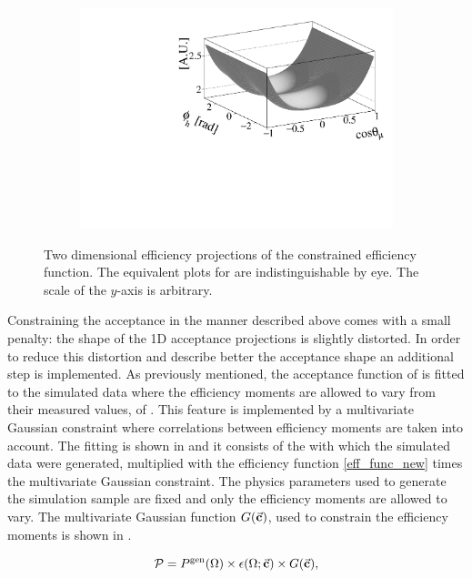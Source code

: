 \begin{figure}[t]
\begin{subfigure}{0.5\textwidth}
    \includegraphics[width=\textwidth]{Figures/Chapter4/canv_cosThL_phi_Sim08_3fb_hel_negKaons_all.pdf}
    \caption{}
    \label{eff2D_lp}
  \end{subfigure}
\caption{Two dimensional efficiency projections of the constrained efficiency function.
         The equivalent plots for \BsbarJpsiKst are indistinguishable by eye. The scale of the $y$-axis is arbitrary.}
    \label{eff2D}
\end{figure}

Constraining the acceptance in the manner described above comes with a small penalty: the shape of the 1D acceptance
projections is slightly distorted. In order to reduce this distortion and describe better the acceptance shape an additional step is implemented.
As previously mentioned, the acceptance function of  is fitted to the simulated data
where the efficiency moments are allowed to vary from their measured values, of .
This feature is implemented by a multivariate Gaussian constraint where correlations between efficiency moments are taken into account.
The fitting \pdf is shown in  and it consists of the \pdf with which the simulated
data were generated, multiplied with the efficiency function \eqref{eff_func_new} times the multivariate Gaussian constraint.
The physics parameters used to generate the simulation sample are fixed and only the efficiency moments are allowed to vary.
The multivariate Gaussian function $G(\vec{\bf{c}})$, used to constrain the efficiency moments is shown in .

\begin{equation}
  \centering
  \mathcal{P}= \Pgen \times\epsilon(\Omega;\vec{\bf c})  \times G(\vec{\bf{c}}),
  \label{mvm_constr}
\end{equation}

